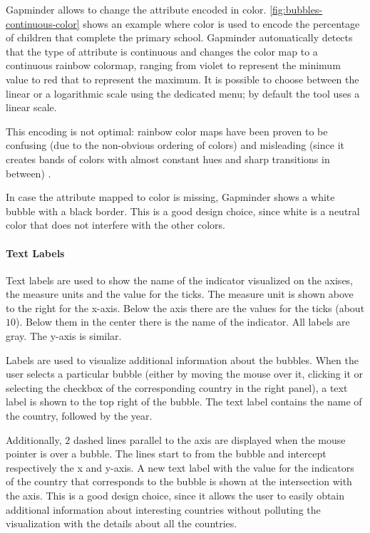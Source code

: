 Gapminder allows to change the attribute encoded in color.
\cref{fig:bubbles-continuous-color} shows an example where color is used to encode the percentage of children that complete the primary school.
Gapminder automatically detects that the type of attribute is continuous and changes the color map to a continuous rainbow colormap, ranging from violet to represent the minimum value to red that to represent the maximum. It is possible to choose between the linear or a logarithmic scale using the dedicated menu; by default the tool uses a linear scale.

This encoding is not optimal:
rainbow color maps have been proven to be confusing (due to the non-obvious ordering of colors) and misleading (since it creates bands of colors with almost constant hues and sharp transitions in between) \cite{color-maps}.

In case the attribute mapped to color is missing, Gapminder shows a white bubble with a black border.
This is a good design choice, since white is a neutral color that does not interfere with the other colors.

\paragraph{Text Labels}
Text labels are used to show the name of the indicator visualized on the axises, the measure units and the value for the ticks.
The measure unit is shown above to the right for the x-axis.
Below the axis there are the values for the ticks (about $10$).
Below them in the center there is the name of the indicator.
All labels are gray.
The y-axis is similar.

Labels are used to visualize additional information about the bubbles.
When the user selects a particular bubble (either by moving the mouse over it, clicking it or selecting the checkbox of the corresponding country in the right panel), a text label is shown to the top right of the bubble.
The text label contains the name of the country, followed by the year.

Additionally, $2$ dashed lines parallel to the axis are displayed when the mouse pointer is over a bubble.
The lines start to from the bubble and intercept respectively the x and y-axis.
A new text label with the value for the indicators of the country that corresponds to the bubble is shown at the intersection with the axis.
This is a good design choice, since it allows the user to easily obtain additional information about interesting countries without polluting the visualization with the details about all the countries.

